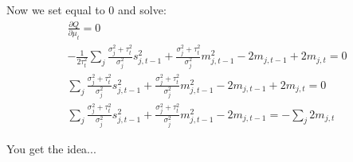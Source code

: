 \documentclass[a4paper,11pt]{article}
\begin{document}
Now we set equal to 0 and solve:
\begin{align*}
    \frac{\partial Q}{\partial \mu_t} = 0 \\
    -\frac1{2\tau_t^2}\sum\limits_j 
    \frac{\sigma_j^2+\tau_t^2}{\sigma_j^2} s_{j,t-1}^2
    + \frac{\sigma_j^2+\tau_t^2}{\sigma_j^2} m_{j,t-1}^2
    - 2m_{j,t-1}
    + 2m_{j,t} = 0 \\
    \sum\limits_j 
    \frac{\sigma_j^2+\tau_t^2}{\sigma_j^2} s_{j,t-1}^2
    + \frac{\sigma_j^2+\tau_t^2}{\sigma_j^2} m_{j,t-1}^2
    - 2m_{j,t-1}
    + 2m_{j,t} = 0 \\
    \sum\limits_j 
    \frac{\sigma_j^2+\tau_t^2}{\sigma_j^2} s_{j,t-1}^2
    + \frac{\sigma_j^2+\tau_t^2}{\sigma_j^2} m_{j,t-1}^2
    - 2m_{j,t-1} = 
    -\sum\limits_j  2m_{j,t}
\end{align*}

You get the idea...
\end{document}
